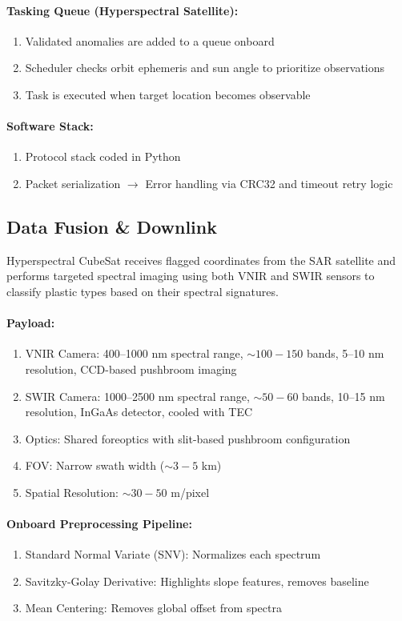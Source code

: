 \documentclass[12pt]{article}
\begin{document}
\paragraph{Tasking Queue (Hyperspectral Satellite):}
\begin{enumerate}
    \item Validated anomalies are added to a queue onboard
    \item Scheduler checks orbit ephemeris and sun angle to prioritize observations
    \item Task is executed when target location becomes observable
\end{enumerate}
\paragraph{Software Stack:}
\begin{enumerate}
    \item Protocol stack coded in Python
    \item Packet serialization $\rightarrow$ Error handling via CRC32 and timeout retry logic
\end{enumerate}

\subsection{Data Fusion \& Downlink}
Hyperspectral CubeSat receives flagged coordinates from the SAR satellite and performs targeted spectral imaging using both VNIR and SWIR sensors to classify plastic types based on their spectral signatures.
\paragraph{Payload:}
\begin{enumerate}
    \item VNIR Camera: 400--1000 nm spectral range, $\sim 100-150$ bands, 5--10 nm resolution, CCD-based pushbroom imaging
    \item SWIR Camera: 1000--2500 nm spectral range, $\sim 50-60$ bands, 10--15 nm resolution, InGaAs detector, cooled with TEC
    \item Optics: Shared foreoptics with slit-based pushbroom configuration
    \item FOV: Narrow swath width ($\sim 3-5$ km)
    \item Spatial Resolution: $\sim 30-50$ m/pixel
\end{enumerate}
\paragraph{Onboard Preprocessing Pipeline:}
\begin{enumerate}
    \item Standard Normal Variate (SNV): Normalizes each spectrum
    \item Savitzky-Golay Derivative: Highlights slope features, removes baseline
    \item Mean Centering: Removes global offset from spectra
\end{enumerate}
\end{document}
